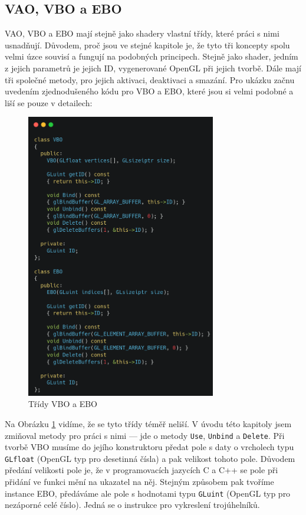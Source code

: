 \documentclass[12pt]{article}
\begin{document}
\pagebreak

\subsection{VAO, VBO a EBO}

VAO, VBO a EBO mají stejně jako shadery vlastní třídy, které práci s nimi usnadňují. Důvodem, proč jsou ve stejné kapitole je, že tyto tři koncepty spolu velmi úzce souvisí a fungují na podobných principech. Stejně jako shader, jedním z jejich parametrů je jejich ID, vygenerované OpenGL při jejich tvorbě. Dále mají tři společné metody, pro jejich aktivaci, deaktivaci a smazání. Pro ukázku začnu uvedením zjednodušeného kódu pro VBO a EBO, které jsou si velmi podobné a liší se pouze v detailech:

\vspace{0.5cm}
\begin{figure}[h]
    \centering
    \includegraphics[height=12.5cm]{images/vbo_ebo.png}
    \caption{Třídy VBO a EBO}
    \label{fig:Třídy VBO a EBO}
\end{figure}

\pagebreak

Na Obrázku \ref{fig:Třídy VBO a EBO} vidíme, že se tyto třídy téměř neliší. V úvodu této kapitoly jsem zmiňoval metody pro práci s nimi — jde o metody \texttt{Use}, \texttt{Unbind} a \texttt{Delete}. Při tvorbě VBO musíme do jejího konstruktoru předat pole s daty o vrcholech typu \texttt{GLfloat} (OpenGL typ pro desetinná čísla) a pak velikost tohoto pole. Důvodem předání velikosti pole je, že v programovacích jazycích C a C++ se pole při přidání ve funkci mění na ukazatel na něj. Stejným způsobem pak tvoříme instance EBO, předáváme ale pole s hodnotami typu \texttt{GLuint} (OpenGL typ pro nezáporné celé číslo). Jedná se o instrukce pro vykreslení trojúhelníků.
\end{document}

